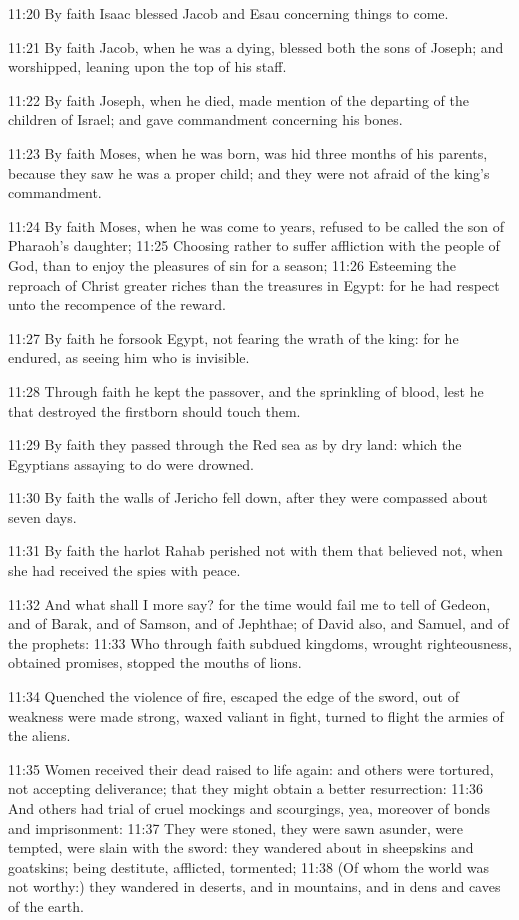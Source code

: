 11:20 By faith Isaac blessed Jacob and Esau concerning things to come.

11:21 By faith Jacob, when he was a dying, blessed both the sons of Joseph; and worshipped, leaning upon the top of his staff.

11:22 By faith Joseph, when he died, made mention of the departing of the children of Israel; and gave commandment concerning his bones.

11:23 By faith Moses, when he was born, was hid three months of his parents, because they saw he was a proper child; and they were not afraid of the king's commandment.

11:24 By faith Moses, when he was come to years, refused to be called the son of Pharaoh's daughter; 11:25 Choosing rather to suffer affliction with the people of God, than to enjoy the pleasures of sin for a season; 11:26 Esteeming the reproach of Christ greater riches than the treasures in Egypt: for he had respect unto the recompence of the reward.

11:27 By faith he forsook Egypt, not fearing the wrath of the king: for he endured, as seeing him who is invisible.

11:28 Through faith he kept the passover, and the sprinkling of blood, lest he that destroyed the firstborn should touch them.

11:29 By faith they passed through the Red sea as by dry land: which the Egyptians assaying to do were drowned.

11:30 By faith the walls of Jericho fell down, after they were compassed about seven days.

11:31 By faith the harlot Rahab perished not with them that believed not, when she had received the spies with peace.

11:32 And what shall I more say? for the time would fail me to tell of Gedeon, and of Barak, and of Samson, and of Jephthae; of David also, and Samuel, and of the prophets: 11:33 Who through faith subdued kingdoms, wrought righteousness, obtained promises, stopped the mouths of lions.

11:34 Quenched the violence of fire, escaped the edge of the sword, out of weakness were made strong, waxed valiant in fight, turned to flight the armies of the aliens.

11:35 Women received their dead raised to life again: and others were tortured, not accepting deliverance; that they might obtain a better resurrection: 11:36 And others had trial of cruel mockings and scourgings, yea, moreover of bonds and imprisonment: 11:37 They were stoned, they were sawn asunder, were tempted, were slain with the sword: they wandered about in sheepskins and goatskins; being destitute, afflicted, tormented; 11:38 (Of whom the world was not worthy:) they wandered in deserts, and in mountains, and in dens and caves of the earth.

